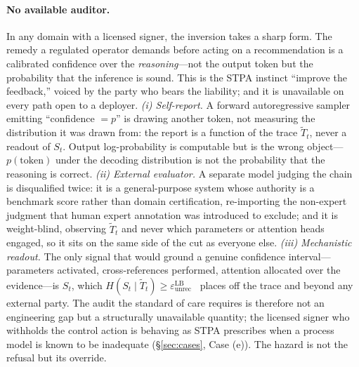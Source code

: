 \paragraph{No available auditor.} In any domain with a licensed signer, the inversion takes a sharp form. The remedy a regulated operator demands before acting on a recommendation is a calibrated confidence over the \emph{reasoning}---not the output token but the probability that the inference is sound. This is the STPA instinct ``improve the feedback,'' voiced by the party who bears the liability; and it is unavailable on every path open to a deployer. \emph{(i) Self-report.} A forward autoregressive sampler emitting ``confidence $=p$'' is drawing another token, not measuring the distribution it was drawn from: the report is a function of the trace $\tilde T_t$, never a readout of $S_t$. Output log-probability is computable but is the wrong object---$p(\text{token})$ under the decoding distribution is not the probability that the reasoning is correct. \emph{(ii) External evaluator.} A separate model judging the chain is disqualified twice: it is a general-purpose system whose authority is a benchmark score rather than domain certification, re-importing the non-expert judgment that human expert annotation was introduced to exclude; and it is weight-blind, observing $\tilde T_t$ and never which parameters or attention heads engaged, so it sits on the same side of the cut as everyone else. \emph{(iii) Mechanistic readout.} The only signal that would ground a genuine confidence interval---parameters activated, cross-references performed, attention allocated over the evidence---is $S_t$, which $H(S_t\mid\tilde T_t)\ge\varepsilon_{\mathrm{unrec}}^{\mathrm{LB}}$~\cite{anon2026dual} places off the trace and beyond any external party. The audit the standard of care requires is therefore not an engineering gap but a structurally unavailable quantity; the licensed signer who withholds the control action is behaving as STPA prescribes when a process model is known to be inadequate (\S\ref{sec:cases}, Case (e)). The hazard is not the refusal but its override.

